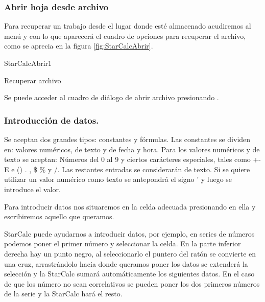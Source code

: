 \subsubsection{Abrir hoja desde archivo} 
Para recuperar un trabajo desde el lugar donde esté almacenado acudiremos
al menú  y  con lo que aparecerá el cuadro de
opciones para recuperar el archivo, como se aprecia en la figura
\ref{fig:StarCalcAbrir}.

\begin{figura}{StarCalcAbrir}{1}
\caption{Recuperar archivo}
\label{fig:StarCalcAbrir}
\end{figura}


Se puede acceder al cuadro de diálogo de abrir archivo presionando
.


\subsubsection{Introducción de datos.} 
 
 
Se aceptan dos grandes tipos: constantes y fórmulas. 
Las constantes se dividen en: valores numéricos, de texto y de fecha y hora.
Para los valores numéricos y de texto se aceptan: 
Números del 0 al 9 y ciertos carácteres especiales, tales como +-E e () . , 
\$ \% y /. Las restantes entradas se considerarán de texto. Si se quiere 
utilizar un valor numérico como texto se antepondrá el signo ' y luego se 
introduce el valor. 

Para introducir datos nos situaremos en la celda adecuada presionando 
en ella y escribiremos aquello que queramos. 
 
StarCalc puede ayudarnos a introducir datos, por ejemplo, en series de 
números podemos poner el primer número y seleccionar la celda. En la parte
inferior derecha hay un punto negro, al seleccionarlo el puntero del ratón se 
convierte en una cruz, arrastrándolo hacia donde queramos poner los datos se
extenderá la selección y la StarCalc sumará automáticamente los siguientes datos.
En el caso de que los número no sean correlativos se pueden poner los dos
primeros números de la serie y la StarCalc hará el resto. 

